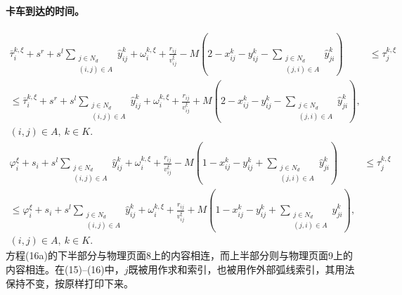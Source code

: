 \documentclass[10pt]{article}
\begin{document}
\paragraph{卡车到达的时间。}
\begin{equation}
\begin{aligned}
\bar\tau_i^{k,\xi}+s^r+s^l\sum_{\substack{j\in N_d\\(i,j)\in A}}\hat y_{ij}^k+\omega_i^{k,\xi}+\frac{r_{ij}}{v_{ij}^\xi}
-M\left(2-x_{ij}^k-y_{ij}^k-\sum_{\substack{j\in N_d\\(j,i)\in A}}\hat y_{ji}^k\right)
&\leq\tau_j^{k,\xi}\\
\leq\bar\tau_i^{k,\xi}+s^r+s^l\sum_{\substack{j\in N_d\\(i,j)\in A}}\hat y_{ij}^k+\omega_i^{k,\xi}+\frac{r_{ij}}{v_{ij}^\xi}
+M\left(2-x_{ij}^k-y_{ij}^k-\sum_{\substack{j\in N_d\\(j,i)\in A}}\hat y_{ji}^k\right),&\\
(i,j)\in A,\ k\in K.&
\end{aligned}\tag{16a}
\end{equation}
\begin{equation}
\begin{aligned}
\varphi_i^\xi+s_i+s^l\sum_{\substack{j\in N_d\\(i,j)\in A}}\hat y_{ij}^k+\omega_i^{k,\xi}+\frac{r_{ij}}{v_{ij}^\xi}
-M\left(1-x_{ij}^k-y_{ij}^k+\sum_{\substack{j\in N_d\\(j,i)\in A}}\hat y_{ji}^k\right)
&\leq\tau_j^{k,\xi}\\
\leq\varphi_i^\xi+s_i+s^l\sum_{\substack{j\in N_d\\(i,j)\in A}}\hat y_{ij}^k+\omega_i^{k,\xi}+\frac{r_{ij}}{v_{ij}^\xi}
+M\left(1-x_{ij}^k-y_{ij}^k+\sum_{\substack{j\in N_d\\(j,i)\in A}}\hat y_{ji}^k\right),&\\
(i,j)\in A,\ k\in K.&
\end{aligned}\tag{16b}
\end{equation}
\noindent 方程(16a)的下半部分与物理页面8上的内容相连，而上半部分则与物理页面9上的内容相连。在(15)--(16)中，$j$既被用作求和索引，也被用作外部弧线索引，其用法保持不变，按原样打印下来。
\end{document}
